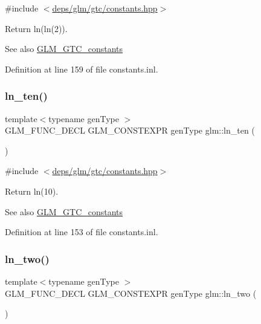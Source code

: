 {\ttfamily \#include $<$\hyperlink{constants_8hpp}{deps/glm/gtc/constants.\+hpp}$>$}

Return ln(ln(2)). \begin{DoxySeeAlso}{See also}
\hyperlink{group__gtc__constants}{G\+L\+M\+\_\+\+G\+T\+C\+\_\+constants} 
\end{DoxySeeAlso}


Definition at line 159 of file constants.\+inl.

\mbox{\label{group__gtc__constants_gaf97ebc6c059ffd788e6c4946f71ef66c}} 
\subsubsection{\texorpdfstring{ln\+\_\+ten()}{ln\_ten()}}
{\footnotesize\ttfamily template$<$typename gen\+Type $>$ \\
G\+L\+M\+\_\+\+F\+U\+N\+C\+\_\+\+D\+E\+CL G\+L\+M\+\_\+\+C\+O\+N\+S\+T\+E\+X\+PR gen\+Type glm\+::ln\+\_\+ten (\begin{DoxyParamCaption}{ }\end{DoxyParamCaption})}



{\ttfamily \#include $<$\hyperlink{constants_8hpp}{deps/glm/gtc/constants.\+hpp}$>$}

Return ln(10). \begin{DoxySeeAlso}{See also}
\hyperlink{group__gtc__constants}{G\+L\+M\+\_\+\+G\+T\+C\+\_\+constants} 
\end{DoxySeeAlso}


Definition at line 153 of file constants.\+inl.

\mbox{\label{group__gtc__constants_ga24f4d27765678116f41a2f336ab7975c}} 
\subsubsection{\texorpdfstring{ln\+\_\+two()}{ln\_two()}}
{\footnotesize\ttfamily template$<$typename gen\+Type $>$ \\
G\+L\+M\+\_\+\+F\+U\+N\+C\+\_\+\+D\+E\+CL G\+L\+M\+\_\+\+C\+O\+N\+S\+T\+E\+X\+PR gen\+Type glm\+::ln\+\_\+two (\begin{DoxyParamCaption}{ }\end{DoxyParamCaption})}



